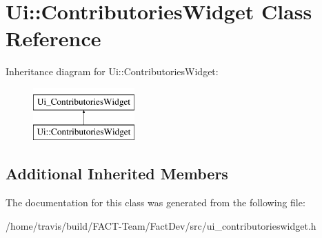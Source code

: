 \hypertarget{classUi_1_1ContributoriesWidget}{\section{Ui\-:\-:Contributories\-Widget Class Reference}
\label{classUi_1_1ContributoriesWidget}
}
Inheritance diagram for Ui\-:\-:Contributories\-Widget\-:\begin{figure}[H]
\begin{center}
\leavevmode
\includegraphics[height=2.000000cm]{d3/db6/classUi_1_1ContributoriesWidget}
\end{center}
\end{figure}
\subsection*{Additional Inherited Members}


The documentation for this class was generated from the following file\-:\begin{DoxyCompactItemize}
\item 
/home/travis/build/\-F\-A\-C\-T-\/\-Team/\-Fact\-Dev/src/ui\-\_\-contributorieswidget.\-h\end{DoxyCompactItemize}

